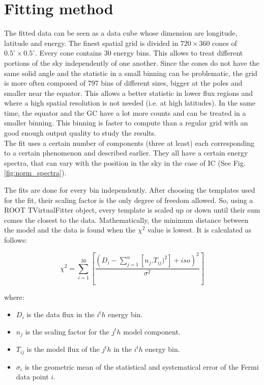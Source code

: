 \section{Fitting method}


The fitted data can be seen as a data cube whose dimension are longitude, latitude and energy. The finest spatial grid is divided in $720 \times 360$ cones of $ 0.5^\circ \times 0.5^\circ $. Every cone contains 30 energy bins. This allows to treat different portions of the sky independently of one another. Since the cones do not have the same solid angle and the statistic in a small binning can be problematic, the grid is more often composed of 797 bins of different sizes, bigger at the poles and smaller near the equator. This allows a better statistic in lower flux regions and where a high spatial resolution is not needed (i.e. at high latitudes). In the same time, the equator and the GC have a lot more counts and can be treated in a smaller binning. This binning is faster to compute than a regular grid with an good enough output quality to study the results.\\

The fit uses a certain number of components (three at least) each corresponding to a certain phenomenon and described earlier. They all have a certain energy spectra, that can vary with the position in the sky in the case of IC (See Fig. \ref{fig:norm_spectra}).

The fits are done for every bin independently. After choosing the templates used for the fit, their scaling factor is the only degree of freedom allowed.  So, using a ROOT TVirtualFitter object, every template is scaled up or down until their sum comes the closest to the data.
Mathematically, the minimum distance between the model and the data is found when the $\chi^2$ value is lowest. It is calculated as follows:

\begin{equation}
\chi^2 = \sum_{i=1}^{30}[\frac{ \left( D_i - \sum_{j=1}^{n} \left[ n_j.T_{ij})^2 \right] + iso \right) ^2}{\sigma^2}]
\end{equation}

where:
\begin{itemize}
\item $D_i$ is the data flux in the $i^th$ energy bin.
\item $n_j$ is the scaling factor for the $j^th$ model component.
\item $T_{ij}$ is the model flux of the $j^th$ in the $i^th$ energy bin.
\item $\sigma_i$ is the geometric mean of the statistical and systematical error of the Fermi data point $i$.
\end{itemize}

